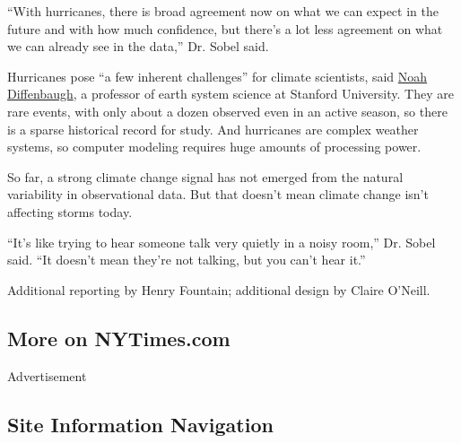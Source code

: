 ``With hurricanes, there is broad agreement now on what we can expect in
the future and with how much confidence, but there's a lot less
agreement on what we can already see in the data,'' Dr. Sobel said.

Hurricanes pose ``a few inherent challenges'' for climate scientists,
said
\href{https://woods.stanford.edu/about/woods-faculty/noah-diffenbaugh}{Noah
Diffenbaugh}, a professor of earth system science at Stanford
University. They are rare events, with only about a dozen observed even
in an active season, so there is a sparse historical record for study.
And hurricanes are complex weather systems, so computer modeling
requires huge amounts of processing power.

So far, a strong climate change signal has not emerged from the natural
variability in observational data. But that doesn't mean climate change
isn't affecting storms today.

``It's like trying to hear someone talk very quietly in a noisy room,''
Dr. Sobel said. ``It doesn't mean they're not talking, but you can't
hear it.''

Additional reporting by Henry Fountain; additional design by Claire
O'Neill.

\hypertarget{more-on-nytimescom}{%
\subsection{More on NYTimes.com}\label{more-on-nytimescom}}

Advertisement

\hypertarget{site-information-navigation}{%
\subsection{Site Information
Navigation}\label{site-information-navigation}}

